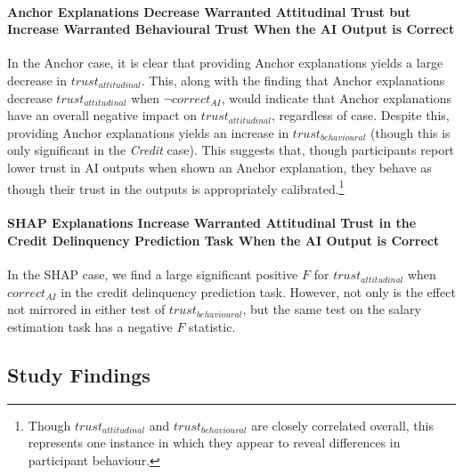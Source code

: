 \paragraph{Anchor Explanations Decrease Warranted Attitudinal Trust but Increase Warranted Behavioural Trust When the AI Output is Correct}
In the Anchor case, it is clear that providing Anchor explanations yields a large decrease in $trust_{attitudinal}$. This, along with the finding that Anchor explanations decrease $trust_{attitudinal}$ when $\neg correct_{AI}$, would indicate that Anchor explanations have an overall negative impact on $trust_{attitudinal}$, regardless of case. Despite this, providing Anchor explanations yields an increase in $trust_{behavioural}$ (though this is only significant in the \emph{Credit} case). This suggests that, though participants report lower trust in AI outputs when shown an Anchor explanation, they behave as though their trust in the outputs is appropriately calibrated.\footnote{Though $trust_{attitudinal}$ and $trust_{behavioural}$ are closely correlated overall, this represents one instance in which they appear to reveal differences in participant behaviour.}

\paragraph{SHAP Explanations Increase Warranted Attitudinal Trust in the Credit Delinquency Prediction Task When the AI Output is Correct}
In the SHAP case, we find a large significant positive $F$ for $trust_{attitudinal}$ when $correct_{AI}$ in the credit delinquency prediction task. However, not only is the effect not mirrored in either test of $trust_{behavioural}$, but the same test on the salary estimation task has a negative $F$ statistic.

\subsection{Study Findings}\label{ssec:os_discussion}


